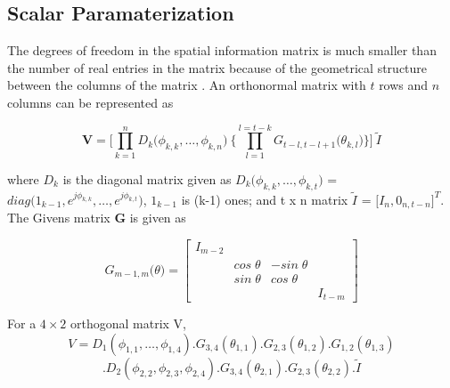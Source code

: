 \documentclass[conference]{IEEEtran}
\begin{document}



\subsection{Scalar Paramaterization}
\label{givens}
The degrees of freedom in the spatial information matrix is much smaller than the number of real entries in the matrix because of the geometrical structure between the columns of the matrix \cite{4114278}. An orthonormal matrix with $t$ rows and $n$ columns can be represented as 

\begin{equation}
\textbf{V} = \Bigg[\prod_{k=1}^{n} D_{k} \big( \phi_{k,k},\ldots , \phi_{k,n} \big) \: \Bigg\{ \prod_{l=1}^{l=t-k} G_{t-l,t-l+1} \big( \theta_{k,l}\big) \Bigg\} \Bigg] \: \tilde{I} 
\end{equation}

where $D_{k}$ is the diagonal matrix given as $D_{k}\big(\phi_{k,k}, \ldots, \phi_{k,t} \big)$ =  $diag\big( 1_{k-1}, e^{j\phi_{k,k}},\ldots, e^{j\phi_{k,t}}  \big)$, $1_{k-1}$ is (k-1) ones; and t x n matrix $\tilde{I}$ = $\big[I_{n}, 0_{n,t-n}\big]^{T}$. The Givens matrix \textbf{G} is given as 

\begin{equation}
G_{m-1,m}\big(\theta\big)  = 
\begin{bmatrix}
I_{m-2} & & & \\
& cos\;\theta & - sin\;\theta & \\
& sin\;\theta & cos\;\theta & \\
& & & I_{t-m}
\end{bmatrix}
\end{equation}


For a $4 \times 2$ orthogonal matrix V, 
$$V = D_{1}(\phi_{1,1},\ldots,\phi_{1,4}).G_{3,4}(\theta_{1,1}) .G_{2,3}(\theta_{1,2}) .G_{1,2}(\theta_{1,3})$$
\vspace{-1.4em}
\hspace{1pt}$$.D_{2}(\phi_{2,2},\phi_{2,3},\phi_{2,4}) .G_{3,4}(\theta_{2,1}) .G_{2,3}(\theta_{2,2}).\tilde{I}$$
\end{document}
